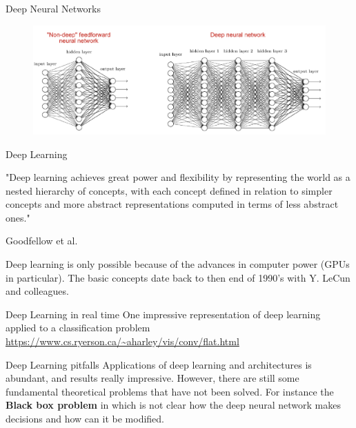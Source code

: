 \documentclass{beamer}
\begin{document}
\begin{frame}{Deep Neural Networks}
			\begin{figure}[h]
	\centering
	\includegraphics[scale=0.4]{Figures/fig_deep_nn.png}
\end{figure}		
\end{frame}

\begin{frame}{Deep Learning}
	
	"Deep learning achieves great power and flexibility by representing the world as a nested hierarchy of concepts, with each concept defined in relation to simpler concepts and more abstract representations computed in terms of less abstract ones."
	
Goodfellow et al. 

Deep  learning is only possible because of the advances in computer power (GPUs in particular). The basic concepts date back to then end of 1990's with Y. LeCun and colleagues. 
\end{frame}

\begin{frame}{Deep Learning in real time}
	One impressive representation of deep learning applied to a classification problem
	\url{https://www.cs.ryerson.ca/~aharley/vis/conv/flat.html}
\end{frame}

\begin{frame}{Deep Learning pitfalls}
	Applications of deep learning and architectures is abundant, and results really impressive. 
	However, there are still some fundamental theoretical problems that have not been solved.
	For instance the \textbf{Black box problem} in which is not clear how the deep neural network makes decisions and how can it be modified.  
\end{frame}
\end{document}
